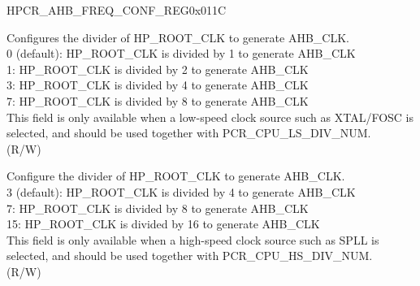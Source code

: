 \begin{register}{H}{PCR\_AHB\_FREQ\_CONF\_REG}{0x011C}\label{regdesc:PCRAHBFREQCONFREG}
%
%
%
\regnewline%
\begin{regdesc}\begin{reglist}
\label{fielddesc:PCRAHBLSDIVNUM}\item [PCR\_AHB\_LS\_DIV\_NUM] Configures the divider of HP\_ROOT\_CLK to generate AHB\_CLK.\\
0 (default): HP\_ROOT\_CLK is divided by 1 to generate AHB\_CLK\\
1: HP\_ROOT\_CLK is divided by 2 to generate AHB\_CLK\\
3: HP\_ROOT\_CLK is divided by 4 to generate AHB\_CLK\\
7: HP\_ROOT\_CLK is divided by 8 to generate AHB\_CLK\\
This field is only available when a low-speed clock source such as XTAL/FOSC is selected, and should be used together with PCR\_CPU\_LS\_DIV\_NUM.\\ (R/W)
\label{fielddesc:PCRAHBHSDIVNUM}\item [PCR\_AHB\_HS\_DIV\_NUM] Configure the divider of HP\_ROOT\_CLK to generate AHB\_CLK.\\
3 (default): HP\_ROOT\_CLK is divided by 4 to generate AHB\_CLK\\
7: HP\_ROOT\_CLK is divided by 8 to generate AHB\_CLK\\
15: HP\_ROOT\_CLK is divided by 16 to generate AHB\_CLK\\
This field is only available when a high-speed clock source such as SPLL is selected, and should be used together with PCR\_CPU\_HS\_DIV\_NUM.\\
(R/W)
\end{reglist}\end{regdesc}
\end{register}


